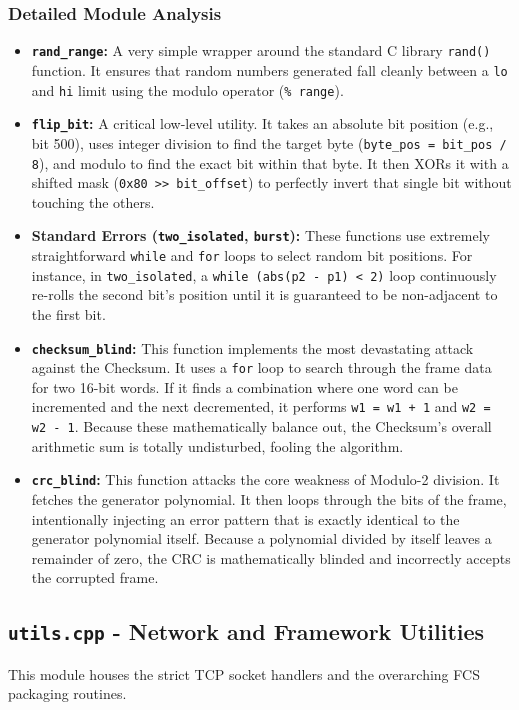 \documentclass[12pt, a4paper]{article}
\begin{document}
\subsubsection{Detailed Module Analysis}
\begin{itemize}
    \item \textbf{\texttt{rand\_range}:} A very simple wrapper around the standard C library \texttt{rand()} function. It ensures that random numbers generated fall cleanly between a \texttt{lo} and \texttt{hi} limit using the modulo operator (\texttt{\% range}).
    \item \textbf{\texttt{flip\_bit}:} A critical low-level utility. It takes an absolute bit position (e.g., bit 500), uses integer division to find the target byte (\texttt{byte\_pos = bit\_pos / 8}), and modulo to find the exact bit within that byte. It then XORs it with a shifted mask (\texttt{0x80 >> bit\_offset}) to perfectly invert that single bit without touching the others.
    \item \textbf{Standard Errors (\texttt{two\_isolated}, \texttt{burst}):} These functions use extremely straightforward \texttt{while} and \texttt{for} loops to select random bit positions. For instance, in \texttt{two\_isolated}, a \texttt{while (abs(p2 - p1) < 2)} loop continuously re-rolls the second bit's position until it is guaranteed to be non-adjacent to the first bit. 
    \item \textbf{\texttt{checksum\_blind}:} This function implements the most devastating attack against the Checksum. It uses a \texttt{for} loop to search through the frame data for two 16-bit words. If it finds a combination where one word can be incremented and the next decremented, it performs \texttt{w1 = w1 + 1} and \texttt{w2 = w2 - 1}. Because these mathematically balance out, the Checksum's overall arithmetic sum is totally undisturbed, fooling the algorithm.
    \item \textbf{\texttt{crc\_blind}:} This function attacks the core weakness of Modulo-2 division. It fetches the generator polynomial. It then loops through the bits of the frame, intentionally injecting an error pattern that is exactly identical to the generator polynomial itself. Because a polynomial divided by itself leaves a remainder of zero, the CRC is mathematically blinded and incorrectly accepts the corrupted frame.
\end{itemize}

\subsection{\texttt{utils.cpp} - Network and Framework Utilities}
This module houses the strict TCP socket handlers and the overarching FCS packaging routines. 
\end{document}
